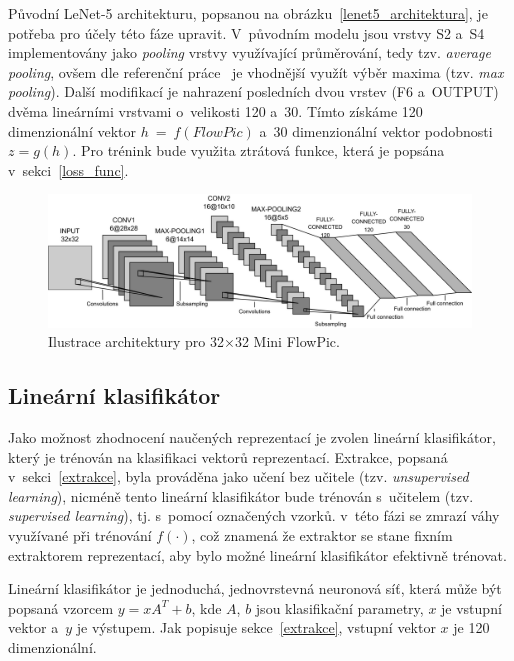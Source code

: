 Původní LeNet-5 architekturu, popsanou na obrázku~\ref{lenet5_architektura}, je potřeba pro účely této fáze upravit. V~původním modelu jsou vrstvy S2 a~S4 implementovány jako \textit{pooling} vrstvy využívající průměrování, tedy tzv. \textit{average pooling}, ovšem dle referenční práce~\cite{flowpic_augmentations} je vhodnější využít výběr maxima (tzv. \textit{max pooling}). Další modifikací je nahrazení posledních dvou vrstev (F6 a~OUTPUT) dvěma lineárními vrstvami o~velikosti 120 a~30. Tímto získáme 120 dimenzionální vektor $h~=~f(FlowPic)$ a~30 dimenzionální vektor podobnosti $z = g(h)$. Pro trénink bude využita ztrátová funkce, která je popsána v~sekci~\ref{loss_func}.
\begin{figure}[H]
	\centering
	\includegraphics[width=1\textwidth]{obrazky-figures/custom_cnn.png}
	\caption{Ilustrace architektury pro 32$\times$32 Mini FlowPic.}
	\label{proposed_architektura}
\end{figure}

\subsection{Lineární klasifikátor}
\label{lin_classifier}
Jako možnost zhodnocení naučených reprezentací je zvolen lineární klasifikátor, který je trénován na klasifikaci vektorů reprezentací. Extrakce, popsaná v~sekci~\ref{extrakce}, byla prováděna jako učení bez učitele (tzv. \textit{unsupervised learning}), nicméně tento lineární klasifikátor bude trénován s~učitelem (tzv. \textit{supervised learning}), tj. s~pomocí označených vzorků. v~této fázi se zmrazí váhy využívané při trénování $f(\cdot)$, což znamená že extraktor se stane fixním extraktorem reprezentací, aby bylo možné lineární klasifikátor efektivně trénovat.

Lineární klasifikátor je jednoduchá, jednovrstevná neuronová síť, která může být popsaná vzorcem $y = xA^{T} + b$, kde $A$, $b$ jsou klasifikační parametry, $x$ je vstupní vektor a~$y$ je výstupem. Jak popisuje sekce~\ref{extrakce}, vstupní vektor $x$ je 120 dimenzionální.
